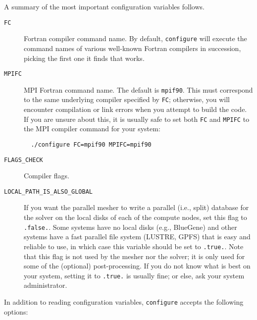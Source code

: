 \noindent
A summary of the most important configuration variables follows.

\begin{description}
\item [{\texttt{FC}}] Fortran compiler command name. By default, \texttt{configure}
will execute the command names of various well-known Fortran compilers
in succession, picking the first one it finds that works.

\item [{\texttt{MPIFC}}] MPI Fortran command name. The default is \texttt{mpif90}.
This must correspond to the same underlying compiler specified by
\texttt{FC}; otherwise, you will encounter compilation or link errors
when you attempt to build the code. If you are unsure about this,
it is usually safe to set both \texttt{FC} and \texttt{MPIFC} to the
MPI compiler command for your system:
{\small
\begin{verbatim}
  ./configure FC=mpif90 MPIFC=mpif90
\end{verbatim}
}
\end{description}

\begin{description}
\item [{\texttt{FLAGS\_CHECK}}] Compiler flags.

\item [{\texttt{LOCAL\_PATH\_IS\_ALSO\_GLOBAL}}]
If you want the parallel mesher to write a parallel (i.e., split) database for the solver on the
local disks of each of the compute nodes, set this flag to \texttt{.false.}.
Some systems have no local disks
(e.g., BlueGene) and other systems have a fast
parallel file system (LUSTRE, GPFS) that is easy and reliable to use, in which case this variable should be set to
\texttt{.true.}. Note that this flag is not used by the mesher nor
the solver; it is only used for some of the (optional) post-processing.
If you do not know what is best on your system, setting it to \texttt{.true.} is usually fine; or else, ask your system administrator.
\end{description}

In addition to reading configuration variables, \texttt{configure}
accepts the following options:

